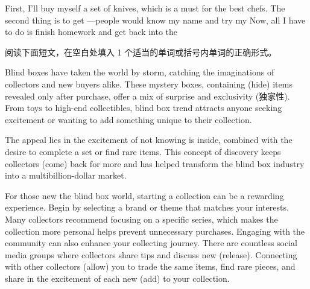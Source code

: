\documentclass{英语试卷}
\begin{document}
\par First, I'll buy myself a set of knives, which is a must for the best chefs. The second thing is to get —people would know my name and try my  Now, all I have to do is finish homework and get back into the \par
{}
\par 阅读下面短文，在空白处填入 1 个适当的单词或括号内单词的正确形式。\par
\par Blind boxes have taken the world by storm, catching the imaginations of collectors and new buyers alike. These mystery boxes, containing \blanknum{} \blanknum{} (hide) items revealed only after purchase, offer a mix of surprise and exclusivity (独家性). From toys to high-end collectibles, \blanknum{} \blanknum{} blind box trend attracts anyone seeking excitement or wanting to add something unique to their collection.\par
\par The appeal lies in the excitement of not knowing  is inside, combined with the desire to complete a set or find rare items. This concept of discovery keeps collectors  (come) back for more and has helped transform the blind box industry into a multibillion-dollar market.\par
\par For those new  the blind box world, starting a collection can be a rewarding experience. Begin by selecting a brand or theme that matches your interests. Many collectors recommend focusing on a specific series, which makes the collection more personal  helps prevent unnecessary purchases. Engaging with the community can also enhance your collecting journey. There are countless social media groups where collectors share tips and discuss new  (release). Connecting with other collectors  (allow) you to trade the same items, find rare pieces, and share in the excitement of each new  (add) to your collection.\par
\end{document}
